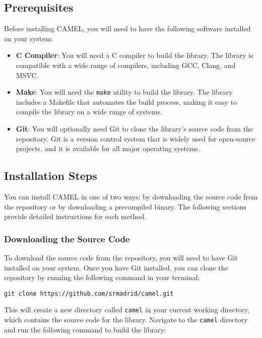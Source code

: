 \documentclass[a4paper,oneside,10pt]{article}
\theoremstyle{definition}
\begin{document}
\subsection{Prerequisites}

Before installing CAMEL, you will need to have the following software installed on your system:
\begin{itemize}
  \item \textbf{C Compiler}: You will need a C compiler to build the library. The library is compatible with a wide range of compilers, including GCC, Clang, and MSVC.
  \item \textbf{Make}: You will need the \texttt{make} utility to build the library. The library includes a Makefile that automates the build process, making it easy to compile the library on a wide range of systems.
  \item \textbf{Git}: You will optionally need Git to clone the library's source code from the repository. Git is a version control system that is widely used for open-source projects, and it is available for all major operating systems.
\end{itemize}

\subsection{Installation Steps}

You can install CAMEL in one of two ways: by downloading the source code from the repository or by downloading a precompiled binary. The following sections provide detailed instructions for each method.

\subsubsection{Downloading the Source Code}

To download the source code from the repository, you will need to have Git installed on your system. Once you have Git installed, you can clone the repository by running the following command in your terminal:

\begin{verbatim}
git clone https://github.com/srmadrid/camel.git
\end{verbatim}

This will create a new directory called \texttt{camel} in your current working directory, which contains the source code for the library. Navigate to the \texttt{camel} directory and run the following command to build the library:
\end{document}
